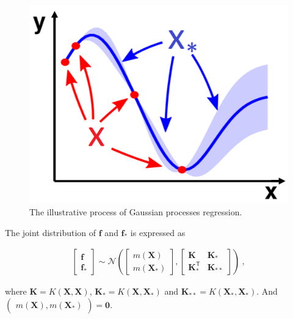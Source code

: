 \documentclass[12pt,letterpaper,fleqn,oneside,titlepage]{offroad-report}
\begin{document}
\begin{figure}[h!]
	\centering
		\includegraphics[scale=.25]{figs/predictions.png}
	\caption{The illustrative process of Gaussian processes regression.}
	\label{FIG:9}
\end{figure}

The joint distribution of $\mathbf{f}$ and $\mathbf{f}_*$ is expressed as
\begin{ceqn}
    \begin{align}
       \begin{bmatrix}\mathbf{f} \\ \mathbf{f}_*\end{bmatrix} \sim \mathcal{N}\left(\begin{bmatrix}m(\mathbf{X})\\ m(\mathbf{X}_*)\end{bmatrix}, \begin{bmatrix}\mathbf{K} & \mathbf{K}_* \\ \mathbf{K}_*^\mathsf{T} & \mathbf{K}_{**}\end{bmatrix}\right) \ , \nonumber
    \end{align}
\end{ceqn}
where $\mathbf{K}=K(\mathbf{X}, \mathbf{X})$, $\mathbf{K}_* = K(\mathbf{X}, \mathbf{X}_*)$ and $\mathbf{K}_{**}=K(\mathbf{X}_*, \mathbf{X}_*)$. And $\begin{pmatrix}m(\mathbf{X}), m(\mathbf{X}_*)\end{pmatrix} = \mathbf{0}$. 
\end{document}
